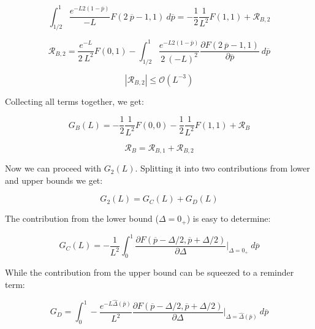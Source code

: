 \documentclass{article}
\theoremstyle{definition}
\begin{document}
\begin{equation}
    \int_{1/2}^{1} 
    \frac{e^{- L 2 (1-\overline{p})}}{- L} 
    F(2 \ \overline{p} - 1, 1)
    \ d \overline{p}
    =
    -\frac{1}{2} \frac{1}{L^2} 
    F(1, 1) +
    \mathcal{R}_{B,2}
\end{equation}

\begin{equation}
    \mathcal{R}_{B,2}
    =
    \frac{e^{- L }}{2 \ L^2} 
    F(0, 1) -
    \int_{1/2}^{1} 
    \frac{e^{- L 2 (1-\overline{p})}}{2 \ (- L)^2} 
    \frac{\partial F(2 \ \overline{p} - 1, 1)}{\partial \overline{p}}
    \ d \overline{p}
\end{equation}

\begin{equation}
    |\mathcal{R}_{B,2}|
    \le
    \mathcal{O}(L^{-3})
\end{equation}

Collecting all terms together, we get:

\begin{equation}
    G_B(L) = 
    -\frac{1}{2} \frac{1}{L^2} 
    F(0, 0) 
    -\frac{1}{2} \frac{1}{L^2} 
    F(1, 1) +
    \mathcal{R}_B
\end{equation}

\begin{equation}
    \mathcal{R}_B
    =
    \mathcal{R}_{B,1} + \mathcal{R}_{B,2}
\end{equation}

Now we can proceed with $G_2(L)$. Splitting it into two contributions from lower and upper bounds we get:

\begin{equation}
    G_2(L) = G_C(L) + G_D(L)
\end{equation}

The contribution from the lower bound ($\Delta=0_+$) is easy to determine:

\begin{equation}
    G_C(L) = -\frac{1}{L^2}
    \int_0^1
    \frac{\partial
    F(\overline{p} - \Delta/2, \overline{p} + \Delta/2) 
    }{\partial \Delta}
    \Bigg |_{\Delta=0_+}
    \ d\overline{p}
\end{equation}

While the contribution from the upper bound can be squeezed to a reminder term:

\begin{equation}
    G_D = \int_0^1 
    -
    \frac{e^{- L \hat{\Delta}(\overline{p})}}{L^2} 
    \frac{\partial
    F(\overline{p} - \Delta/2, \overline{p} + \Delta/2) 
    }{\partial \Delta}
    \Bigg |_{\Delta=\hat{\Delta}(\overline{p})}
    \ d\overline{p}
\end{equation}
\end{document}
